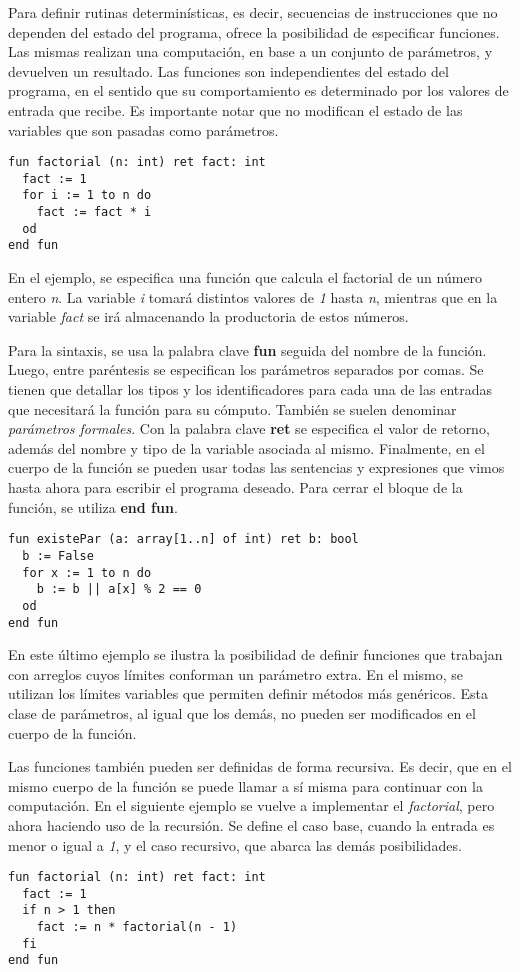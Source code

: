 \documentclass{article}
\begin{document}
Para definir rutinas determinísticas, es decir, secuencias de instrucciones que no dependen del estado del programa, \Lang\space ofrece la posibilidad de especificar funciones.
Las mismas realizan una computación, en base a un conjunto de parámetros, y devuelven un resultado.
Las funciones son independientes del estado del programa, en el sentido que su comportamiento es determinado por los valores de entrada que recibe.
Es importante notar que no modifican el estado de las variables que son pasadas como parámetros.
\begin{lstlisting}
fun factorial (n: int) ret fact: int
  fact := 1
  for i := 1 to n do
    fact := fact * i
  od
end fun
\end{lstlisting}

En el ejemplo, se especifica una función que calcula el factorial de un número entero \textit{n}.
La variable \textit{i} tomará distintos valores de \textit{1} hasta \textit{n}, mientras que en la variable \textit{fact} se irá almacenando la productoria de estos números.

Para la sintaxis, se usa la palabra clave \textbf{fun} seguida del nombre de la función.
Luego, entre paréntesis se especifican los parámetros separados por comas.
Se tienen que detallar los tipos y los identificadores para cada una de las entradas que necesitará la función para su cómputo.
También se suelen denominar \textit{parámetros formales}.
Con la palabra clave \textbf{ret} se especifica el valor de retorno, además del nombre y tipo de la variable asociada al mismo.
Finalmente, en el cuerpo de la función se pueden usar todas las sentencias y expresiones que vimos hasta ahora para escribir el programa deseado.
Para cerrar el bloque de la función, se utiliza \textbf{end fun}.
\begin{lstlisting}
fun existePar (a: array[1..n] of int) ret b: bool
  b := False
  for x := 1 to n do
    b := b || a[x] % 2 == 0
  od
end fun
\end{lstlisting}

En este último ejemplo se ilustra la posibilidad de definir funciones que trabajan con arreglos cuyos límites conforman un parámetro extra.
En el mismo, se utilizan los límites variables que permiten definir métodos más genéricos.
Esta clase de parámetros, al igual que los demás, no pueden ser modificados en el cuerpo de la función.

Las funciones también pueden ser definidas de forma recursiva.
Es decir, que en el mismo cuerpo de la función se puede llamar a sí misma para continuar con la computación.
En el siguiente ejemplo se vuelve a implementar el \textit{factorial}, pero ahora haciendo uso de la recursión.
Se define el caso base, cuando la entrada es menor o igual a \textit{1}, y el caso recursivo, que abarca las demás posibilidades.
\begin{lstlisting}
fun factorial (n: int) ret fact: int
  fact := 1
  if n > 1 then
    fact := n * factorial(n - 1)
  fi
end fun
\end{lstlisting}
\end{document}
